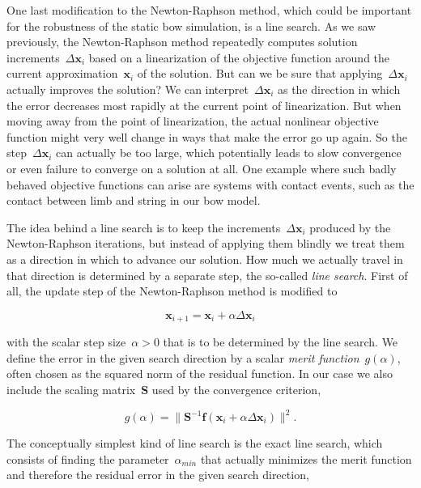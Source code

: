 One last modification to the Newton-Raphson method, which could be important for the robustness of the static bow simulation, is a line search.
As we saw previously, the Newton-Raphson method repeatedly computes solution increments~$\Delta\boldsymbol{x}_{i}$ based on a linearization of the objective function around the current approximation~$\boldsymbol{x}_{i}$ of the solution.
But can we be sure that applying~$\Delta\boldsymbol{x}_{i}$ actually improves the solution?
We can interpret~$\Delta\boldsymbol{x}_{i}$ as the direction in which the error decreases most rapidly at the current point of linearization.
But when moving away from the point of linearization, the actual nonlinear objective function might very well change in ways that make the error go up again.
So the step~$\Delta\boldsymbol{x}_{i}$ can actually be too large, which potentially leads to slow convergence or even failure to converge on a solution at all.
One example where such badly behaved objective functions can arise are systems with contact events, such as the contact between limb and string in our bow model.

The idea behind a line search is to keep the increments~$\Delta\boldsymbol{x}_{i}$ produced by the Newton-Raphson iterations, but instead of applying them blindly we treat them as a direction in which to advance our solution.
How much we actually travel in that direction is determined by a separate step, the so-called \textit{line search}.
First of all, the update step of the Newton-Raphson method is modified to

\begin{equation}
\boldsymbol{x}_{i+1} = \boldsymbol{x}_{i} + \alpha\Delta\boldsymbol{x}_{i}
\end{equation}

with the scalar step size~$\alpha > 0$ that is to be determined by the line search.
We define the error in the given search direction by a scalar \textit{merit function}~$g(\alpha)$, often chosen as the squared norm of the residual function.
In our case we also include the scaling matrix~$\boldsymbol{S}$ used by the convergence criterion,

\begin{equation}
g(\alpha) = \lVert \boldsymbol{S}^{-1}\boldsymbol{f}(\boldsymbol{x}_{i} + \alpha\Delta\boldsymbol{x}_{i}) \rVert^2.
\end{equation}

The conceptually simplest kind of line search is the exact line search, which consists of finding the parameter~$\alpha_{min}$ that actually minimizes the merit function and therefore the residual error in the given search direction,

